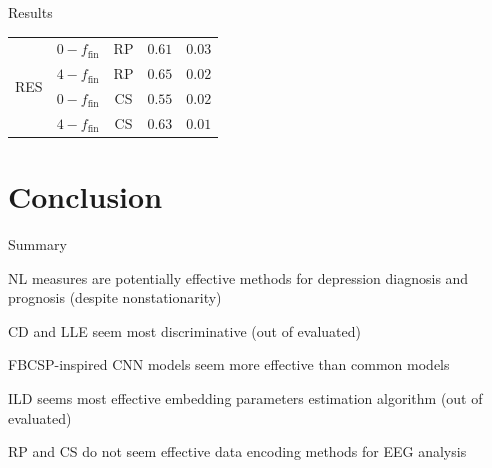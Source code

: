 \documentclass{beamer}
\begin{document}
\begin{frame}{Results}
\begin{table}[tbp]
{\begin{tabular}{|c|c|c|c|c|}
\multirow{4}{*}{RES} & $0-f_{\text{fin}}$ & RP &   $0.61$ & $0.03$ \\ \cline{2-5}               
                     & $4-f_{\text{fin}}$ & RP &       $\mathbf{0.65}$ & $0.02$    \\ \cline{2-5}   
                     & $0-f_{\text{fin}}$ & CS &      $0.55$ & $0.02$ \\ \cline{2-5}               
                     & $4-f_{\text{fin}}$ & CS &      $0.63$ & $0.01$ \\ \hline               
\end{tabular}
}
\end{table}
\end{frame}


\section{Conclusion}


\begin{frame}{Summary}
    \centering
    \begin{enumerate}
        \item NL measures are potentially effective methods for depression diagnosis and prognosis {\scriptsize(despite nonstationarity)}
        \item CD and LLE seem most discriminative {\scriptsize{(out of evaluated)}}
        \item FBCSP-inspired CNN models seem more effective than common models
        {\scriptsize
        \item ILD seems most effective embedding parameters estimation algorithm {\scriptsize(out of evaluated)}
        \item RP and CS do not seem effective data encoding methods for EEG analysis
        }
    \end{enumerate}
    
\end{frame}

\end{document}

